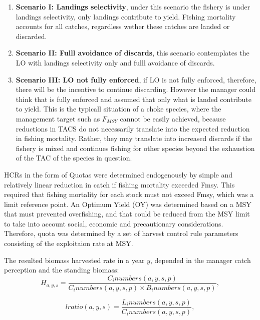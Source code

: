 \documentclass[12pt,oneline,a4paper,numbib]{ouparticle}
\numberwithin{equation}{subsection} %
\begin{document}
\begin{enumerate}

\item
\textbf{Scenario I: Landings selectivity},  under this scenario the fishery is under landings selectivity, only landings contribute to yield. Fishing mortality accounts for all catches, regardless wether these catches are landed or discarded.

\item
\textbf{Scenario II: Fulll avoidance of discards}, this scenario contemplates the LO with landings selectivity only and fulll avoidance of discards.

\item 
\textbf{Scenario III: LO not fully enforced}, if LO is not fully enforced, therefore, there will be the incentive to continue discarding. However the manager could think that is fully enforced and assumed that only what is landed contribute to yield. This is the typicall situation of a choke species, where the management target such as $F_{MSY}$ cannot be easily achieved, because reductions in TACS do not necessarily translate into the expected reduction in fishing mortality. Rather, they may translate into increased discards if the fishery is mixed and continues fishing for other species beyond the exhaustion of the TAC of the species in question.

\end{enumerate}

HCRs in the form of Quotas were determined endogenously by simple and relatively linear reduction in catch if fishing mortality exceeded Fmsy. This required that fishing mortality for each stock must not exceed Fmsy, which was a limit reference point. An Optimum Yield (OY) was determined based on a MSY that must prevented overfishing, and that could be reduced from the MSY limit to take into account social, economic and precautionary considerations.  Therefore, quota was determined by a set of harvest control rule parameters consisting of the exploitaion rate at MSY.

The resulted biomass harvested rate in a year $y$, depended in the manager catch perception and the standing biomass:
\begin{equation}
 H_{a, y, s} =\frac
                {C_i numbers(a, y, s, p)}
                {C_i numbers(a, y, s, p) \times B_i numbers(a, y, s, p)},
\end{equation}

\begin{equation}
 lratio (a, y, s) = \frac
                {L_i numbers(a, y, s, p)}
                {C_i numbers(a, y, s, p)},
\end{equation}
\end{document}
